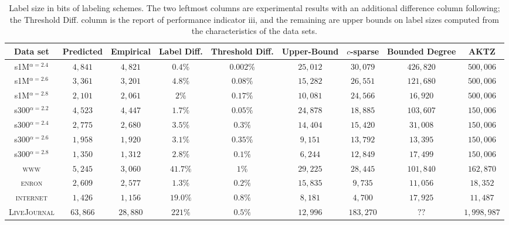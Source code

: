 \begin{table}
\small
\begin{tabular}{ccccccccc}
Data set&Predicted &Empirical & Label Diff. & Threshold Diff.   & Upper-Bound     &$c$-sparse &Bounded Degree \cite{adjiashvili2014labeling} &AKTZ \cite{alstrup2014adjacency}\\\hline
s1M$^{\alpha=2.4}$  &$4,841$    &$4,821$  & $0.4\%$ & $0.002\%$  & $25,012 $ &$30,079$     &$426,820$ &$500,006$\\\hline
s1M$^{\alpha=2.6}$  &$3,361$    &$3,201$   & $4.8\%$ & $0.08\%$  & $15,282 $ &$26,551$     &$121,680$ &$500,006$\\\hline
s1M$^{\alpha=2.8}$  &$2,101$    &$2,061$    & $2\%$ & $0.17\%$  & $10,081 $ &$24,566$     &$16,920$  &$500,006$\\\hline
s300$^{\alpha=2.2}$ &$4,523$    &$4,447$  & $1.7\%$ & $0.05\%$  & $24,878 $ &$18,885$     &$103,607$ &$150,006$\\\hline
s300$^{\alpha=2.4}$ &$2,775$    &$2,680$   & $3.5\%$  & $0.3\%$ & $14,404 $ &$15,420$     &$31,008$  &$150,006$\\\hline
s300$^{\alpha=2.6}$ &$1,958$    &$1,920$  & $3.1\%$ & $0.35\%$   & $9,151 $  &$13,792$     &$13,395$  &$150,006$\\\hline
s300$^{\alpha=2.8}$ &$1,350$    &$1,312$  & $2.8\%$ & $0.1\%$   & $6,244 $  &$12,849$     &$17,499$  &$150,006$\\\hline
\textsc{www}        &$5,245$    &$3,060$  & $41.7\%$  & $1\%$  & $29,225 $ &$28,445$     &$101,840$ &$162,870$ \\\hline
\textsc{enron}      &$2,609$    &$2,577$  & $1.3\%$ & $0.2\%$   & $15,835 $ &$9,735$      &$11,056$  &$18,352$\\\hline
\textsc{internet}   &$1,426$    &$1,156$  & $19.0\%$  & $0.8\%$  & $8,181 $  &$4,700$      &$17,925$  &$11,487$\\\hline 
\textsc{LiveJournal}   &$63,866$    &$28,880$  & $221\%$  & $0.5\%$  & $12,996 $  &$183,270$      &$??$  &$1,998,987$\\\hline 
\end{tabular}
\caption{Label size in bits of labeling schemes. The two leftmost columns are experimental results with an additional difference column following; the Threshold Diff. column is the report of performance indicator iii, and the remaining are upper bounds on label sizes computed from the characteristics of the data sets.}
\label{t:labelsizes}
\end{table}

